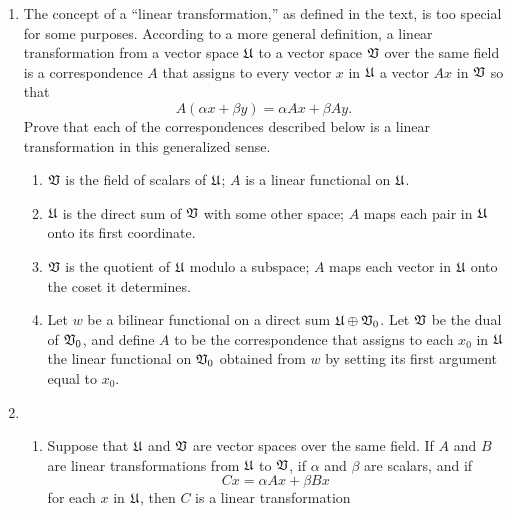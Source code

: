 {\begin{enumerate}[label=(\arabic*), wide]
    the space of all linear transformations on \(\VecSp\) is finite-dimensional,
    and find its dimension.
    \item The concept of a ``linear transformation,'' as defined in the text, is
    too special for some purposes. According to a more general definition, a
    linear transformation from a vector space \(\frak{U}\) to a vector space
    \(\VecSp\) over the same field is a correspondence \(A\) that assigns to
    every vector \(x\) in \(\frak{U}\) a vector \(Ax\) in \(\VecSp\) so that
    \begin{equation*}
        A(\alpha x + \beta y) = \alpha Ax + \beta Ay.
    \end{equation*}
    Prove that each of the correspondences described below is a linear
    transformation in this generalized sense.
    \begin{enumerate}[label=(\alph*), wide, nosep]
        \item \(\VecSp\) is the field of scalars of \(\frak{U}\); \(A\) is a
        linear functional on \(\frak{U}\).
        \item \(\frak{U}\) is the direct sum of \(\VecSp\) with some other
        space; \(A\) maps each pair in \(\frak{U}\) onto its first coordinate.
        \item \(\VecSp\) is the quotient of \(\frak{U}\) modulo a subspace;
        \(A\) maps each vector in \(\frak{U}\) onto the coset it determines.
        \item Let \(w\) be a bilinear functional on a direct sum \(\frak{U}
        \oplus \mathfrak{V}_0\). Let \(\VecSp\) be the dual of \(\mathfrak{V}_0\), and
        define \(A\) to be the correspondence that assigns to each \(x_0\) in
        \(\frak{U}\) the linear functional on \(\mathfrak{V}_0\) obtained from \(w\)
        by setting its first argument equal to \(x_0\).
    \end{enumerate}
    \item \begin{enumerate}[label=(\alph*), wide, nosep]
        \item Suppose that \(\frak{U}\) and \(\VecSp\) are vector spaces over
        the same field. If \(A\) and \(B\) are linear transformations from
        \(\frak{U}\) to \(\VecSp\), if \(\alpha\) and \(\beta\) are scalars, and
        if
        \begin{equation*}
            Cx = \alpha Ax + \beta Bx
        \end{equation*}
        for each \(x\) in \(\frak{U}\), then \(C\) is a linear transformation

\end{enumerate}
\end{enumerate}}
